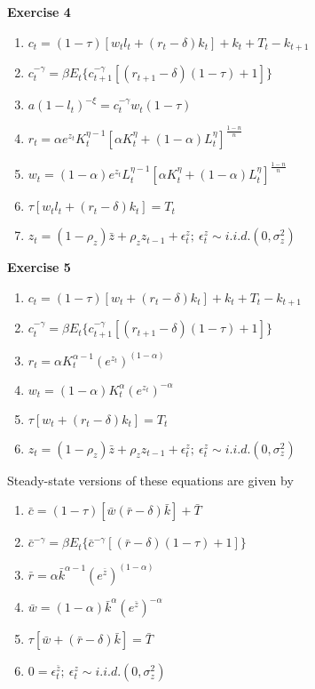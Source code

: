 \documentclass[letterpaper,12pt]{article}
\begin{document}
\textbf{Exercise 4}

\begin{enumerate}
	\item $c_t = (1 - \tau)[w_t l_t + (r_t - \delta) k_t] + k_t + T_t - k_{t+1}$
	\item $c_t^{-\gamma} = \beta E_t \{c_{t+1}^{-\gamma} [(r_{t+1} - \delta)(1 - \tau) + 1]\}$
	\item $a (1 - l_t)^{-\xi} = c_t^{-\gamma} w_t (1 - \tau)$
	\item $r_t = \alpha e^{z_t} K_t^{\eta - 1} [\alpha K_t^\eta + (1 - \alpha) L_t^\eta]^{\frac{1-n}{n}}$
	\item $w_t = (1 - \alpha) e^{z_t} L_t^{\eta - 1}[\alpha K_t^\eta + (1 - \alpha)L_t^\eta]^{\frac{1-n}{n}}$
	\item $\tau[w_t l_t + (r_t - \delta) k_t] = T_t$
	\item $z_t = (1 - \rho_z) \bar{z} + \rho_z z_{t-1} + \epsilon_t^z; \ \epsilon_t^z \sim i.i.d.(0, \sigma_z^2)$
\end{enumerate}

\textbf{Exercise 5}

\begin{enumerate}
	\item $c_t = (1 - \tau)[w_t + (r_t - \delta) k_t] + k_t + T_t - k_{t+1}$
	\item $c_t^{-\gamma} = \beta E_t \{c_{t+1}^{-\gamma} [(r_{t+1} - \delta)(1 - \tau) + 1]\}$
	\item $r_t = \alpha K_t^{\alpha-1} (e^{z_t})^{(1 - \alpha)}$
	\item $w_t = (1 - \alpha) K_t^\alpha (e^{z_t}) ^{-\alpha}$
	\item $\tau[w_t + (r_t - \delta) k_t] = T_t$
	\item $z_t = (1 - \rho_z) \bar{z} + \rho_z z_{t-1} + \epsilon_t^z; \ \epsilon_t^z \sim i.i.d.(0, \sigma_z^2)$
\end{enumerate}

Steady-state versions of these equations are given by
\begin{enumerate}
	\item $\bar{c} = (1 - \tau)[\bar{w} (\bar{r} - \delta) \bar{k}]  + \bar{T} $
	\item $\bar{c}^{-\gamma} = \beta E_t \{\bar{c}^{-\gamma} [(\bar{r} - \delta)(1 - \tau) + 1]\}$
	\item $\bar{r} = \alpha \bar{k}^{\alpha-1} (e^{\bar{z}})^{(1 - \alpha)}$
	\item $\bar{w} = (1 - \alpha) \bar{k}^\alpha (e^{\bar{z}}) ^{-\alpha}$
	\item $\tau[\bar{w} + (\bar{r} - \delta) \bar{k}] = \bar{T}$
	\item $0 = \epsilon_t^{\bar{z}}; \ \epsilon_t^z \sim i.i.d.(0, \sigma_z^2)$
\end{enumerate}
\end{document}
